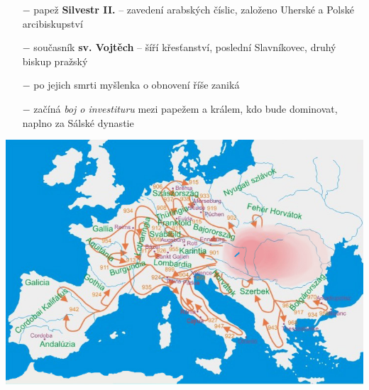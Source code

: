 \documentclass{article}
\begin{document}
\begin{minipage}{0.6\textwidth}
\begin{itemize}
\begin{itemize}
                \item[$-$] papež \textbf{Silvestr II.} -- zavedení arabských číslic, založeno Uherské a Polské arcibiskupství
                \item[$-$] současník \textbf{sv. Vojtěch} -- šíří křesťanství, poslední Slavníkovec, druhý biskup pražský
                \item[$-$] po jejich smrti myšlenka o obnovení říše zaniká
                \item[$-$] začíná \textit{boj o investituru} mezi papežem a králem, kdo bude dominovat, naplno za Sálské dynastie
            \end{itemize}
    \end{itemize}
\end{minipage}
\hfill
\noindent\begin{minipage}{0.3\textwidth}
    \includegraphics[width=\linewidth]{madari.jpg}
    \vspace{1em}

\end{minipage}
\end{document}
